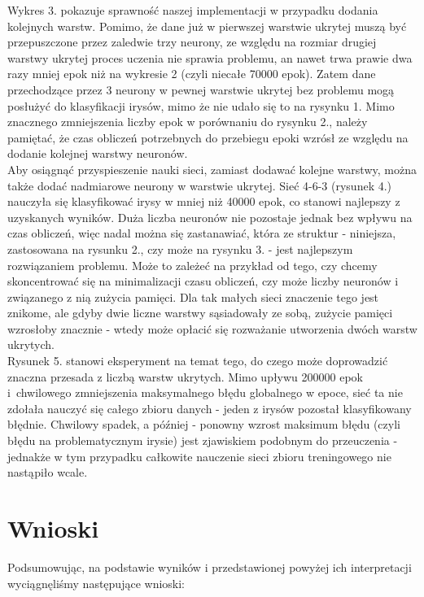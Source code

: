 \documentclass{classrep}
\begin{document}
Wykres 3. pokazuje sprawność naszej implementacji w przypadku dodania kolejnych warstw.
Pomimo, że dane już w pierwszej warstwie ukrytej muszą być przepuszczone przez zaledwie
trzy neurony, ze względu na rozmiar drugiej warstwy ukrytej proces uczenia nie sprawia
problemu, an nawet trwa prawie dwa razy mniej epok niż na wykresie 2 (czyli niecałe 70000 epok).
Zatem dane przechodzące przez 3 neurony w pewnej warstwie ukrytej bez
problemu mogą posłużyć do klasyfikacji irysów, mimo że nie udało się to na rysynku 1.
Mimo znacznego zmniejszenia liczby epok w porównaniu do rysynku 2., należy pamiętać,
że czas obliczeń potrzebnych do przebiegu epoki wzrósł ze względu na dodanie
kolejnej warstwy neuronów. \\

Aby osiągnąć przyspieszenie nauki sieci, zamiast dodawać kolejne warstwy, można także
dodać nadmiarowe neurony w warstwie ukrytej. Sieć 4-6-3 (rysunek 4.) nauczyła się
klasyfikować irysy w mniej niż 40000 epok, co stanowi najlepszy z uzyskanych wyników.
Duża liczba neuronów nie pozostaje jednak bez wpływu na czas obliczeń, więc nadal
można się zastanawiać, która ze struktur - niniejsza, zastosowana na rysunku 2., czy może na rysynku 3.
- jest najlepszym rozwiązaniem problemu. Może to zależeć na przykład od tego, czy chcemy
skoncentrować się na minimalizacji czasu obliczeń, czy może liczby neuronów i
związanego z nią zużycia pamięci. Dla tak małych sieci znaczenie tego jest znikome,
ale gdyby dwie liczne warstwy sąsiadowały ze sobą, zużycie pamięci wzrosłoby znacznie
- wtedy może opłacić się rozważanie utworzenia dwóch warstw ukrytych. \\

Rysunek 5. stanowi eksperyment na temat tego, do czego może doprowadzić znaczna
przesada z liczbą warstw ukrytych. Mimo upływu 200000 epok i~chwilowego
zmniejszenia maksymalnego błędu globalnego w epoce, sieć ta nie zdołała
nauczyć się całego zbioru danych - jeden z irysów pozostał klasyfikowany błędnie.
Chwilowy spadek, a później - ponowny wzrost maksimum błędu (czyli błędu
na problematycznym irysie) jest zjawiskiem podobnym do przeuczenia - jednakże
w tym przypadku całkowite nauczenie sieci zbioru treningowego nie
nastąpiło wcale. \\

\section{Wnioski}
Podsumowując, na podstawie wyników i przedstawionej powyżej ich interpretacji
wyciągnęliśmy następujące wnioski:
\end{document}
